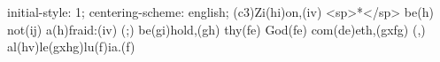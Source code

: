 initial-style: 1;
centering-scheme: english;
(c3)Zi(hi)on,(iv) <sp>*</sp> be(h) not(ij) a(h)fraid:(iv) (;) be(gi)hold,(gh) thy(fe) God(fe) com(de)eth,(gxfg) (,) al(hv)le(gxhg)lu(f)ia.(f)
